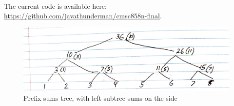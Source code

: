 \documentclass[12pt]{article}
\begin{document}
The current code is available here: \url{https://github.com/javathunderman/cmsc858n-final}.

\begin{figure}[H]
    \centering
    \includegraphics[width=0.75\linewidth]{images/prefixsumstree.jpg}
    \caption{Prefix sums tree, with left subtree sums on the side}
\end{figure}
\clearpage
\nocite{*}
\printbibliography
\end{document}
